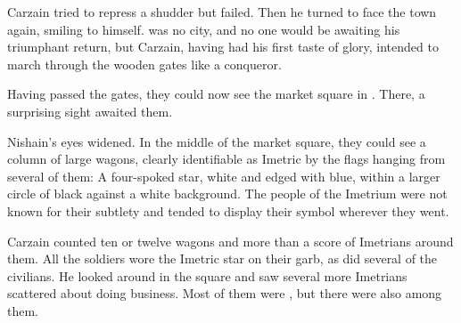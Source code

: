 Carzain tried to repress a shudder but failed. Then he turned to face the town again, smiling to himself. \Bryndwin{} was no city, and no one would be awaiting his triumphant return, but Carzain, having had his first taste of glory, intended to march through the wooden gates like a conqueror. 



\begin{comment}
\section{\Bryndwin}
\end{comment}
\begin{comment}
\subsection{The Imetric caravan}
\end{comment}

\new
{} Having passed the gates, they could now see the market square in \Bryndwin{}. There, a surprising sight awaited them. 

Nishain's eyes widened.  In the middle of the market square, they could see a column of large wagons, clearly identifiable as Imetric by the flags hanging from several of them: A four-spoked star, white and edged with blue, within a larger circle of black against a white background. The people of the Imetrium were not known for their subtlety and tended to display their symbol wherever they went. 

Carzain counted ten or twelve wagons and more than a score of Imetrians around them. All the soldiers wore the Imetric star on their garb, as did several of the civilians. He looked around in the square and saw several more Imetrians scattered about doing business. Most of them were , but there were also \humans{} among them. %

